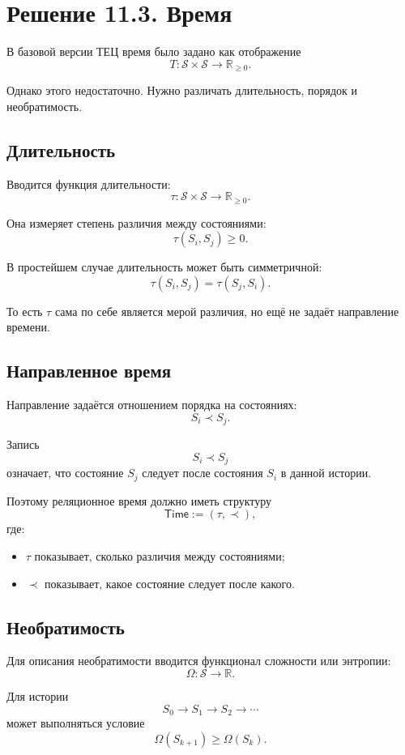 \documentclass[12pt,a4paper]{article}
\newcommand{\States}{\mathcal S}
\newcommand{\Time}{\mathsf{Time}}
\begin{document}
\section{Решение 11.3. Время}

В базовой версии ТЕЦ время было задано как отображение
\[
T:\States\times\States\to\mathbb R_{\ge0}.
\]

Однако этого недостаточно. Нужно различать длительность, порядок и необратимость.

\subsection{Длительность}

Вводится функция длительности:
\[
\tau:\States\times\States\to\mathbb R_{\ge0}.
\]

Она измеряет степень различия между состояниями:
\[
\tau(S_i,S_j)\ge0.
\]

В простейшем случае длительность может быть симметричной:
\[
\tau(S_i,S_j)=\tau(S_j,S_i).
\]

То есть \(\tau\) сама по себе является мерой различия, но ещё не задаёт направление времени.

\subsection{Направленное время}

Направление задаётся отношением порядка на состояниях:
\[
S_i\prec S_j.
\]

Запись
\[
S_i\prec S_j
\]
означает, что состояние \(S_j\) следует после состояния \(S_i\) в данной истории.

Поэтому реляционное время должно иметь структуру
\[
\Time := (\tau,\prec),
\]
где:
\begin{itemize}
    \item \(\tau\) показывает, сколько различия между состояниями;
    \item \(\prec\) показывает, какое состояние следует после какого.
\end{itemize}

\subsection{Необратимость}

Для описания необратимости вводится функционал сложности или энтропии:
\[
\Omega:\States\to\mathbb R.
\]

Для истории
\[
S_0\to S_1\to S_2\to\cdots
\]
может выполняться условие
\[
\Omega(S_{k+1})\ge\Omega(S_k).
\]
\end{document}
